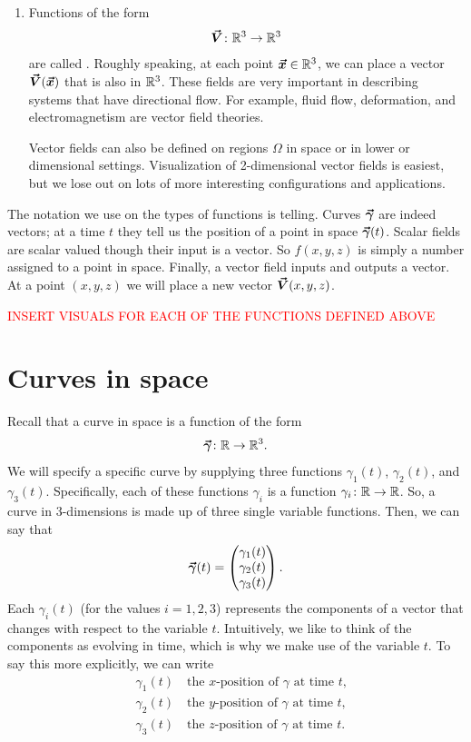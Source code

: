 \begin{enumerate}[(1)]
        \item Functions of the form
        \[
        \boldsymbol{\vec{V}} \colon \mathbb{R}^3 \to \mathbb{R}^3
        \]
        are called .  Roughly speaking, at each point $\boldsymbol{\boldsymbol{\vec{x}}} \in \mathbb{R}^3$, we can place a vector $\boldsymbol{\vec{V}}(\boldsymbol{\boldsymbol{\vec{x}}})$ that is also in $\mathbb{R}^3$.  These fields are very important in describing systems that have directional flow.  For example, fluid flow, deformation, and electromagnetism are vector field theories. 

        Vector fields can also be defined on regions $\Omega$ in space or in lower or dimensional settings. Visualization of 2-dimensional vector fields is easiest, but we lose out on lots of more interesting configurations and applications. 
        \end{enumerate}
        
        The notation we use on the types of functions is telling. Curves $\boldsymbol{\vec{\gamma}}$ are indeed vectors; at a time $t$ they tell us the position of a point in space $\boldsymbol{\vec{\gamma}}(t)$. Scalar fields are scalar valued though their input is a vector. So $f(x,y,z)$ is simply a number assigned to a point in space. Finally, a vector field inputs and outputs a vector. At a point $(x,y,z)$ we will place a new vector $\boldsymbol{\vec{V}}(x,y,z)$.

        \textcolor{red}{ INSERT VISUALS FOR EACH OF THE FUNCTIONS DEFINED ABOVE}
        
        \section{Curves in space}
        
        Recall that a curve in space is a function of the form
        \[
        \boldsymbol{\vec{\gamma}} \colon \mathbb{R} \to \mathbb{R}^3.
        \]
        We will specify a specific curve by supplying three functions $\gamma_1(t)$, $\gamma_2(t)$, and $\gamma_3(t)$. Specifically, each of these functions $\gamma_i$ is a function $\gamma_i\colon \mathbb{R} \to \mathbb{R}$. So, a curve in 3-dimensions is made up of three single variable functions. Then, we can say that
        \[
        \boldsymbol{\vec{\gamma}}(t)=\begin{pmatrix} \gamma_1(t)\\ \gamma_2(t)\\ \gamma_3(t)\end{pmatrix}.
        \]
       Each $\gamma_i(t)$ (for the values $i=1,2,3$) represents the components of a vector that changes with respect to the variable $t$. Intuitively, we like to think of the components as evolving in time, which is why we make use of the variable $t$. To say this more explicitly, we can write
        \begin{align*}
            &\gamma_1(t) \quad \textrm{the $x$-position of $\gamma$ at time $t$,}\\
            &\gamma_2(t) \quad \textrm{the $y$-position of $\gamma$ at time $t$,}\\
            &\gamma_3(t) \quad \textrm{the $z$-position of $\gamma$ at time $t$.}
        \end{align*}
        
